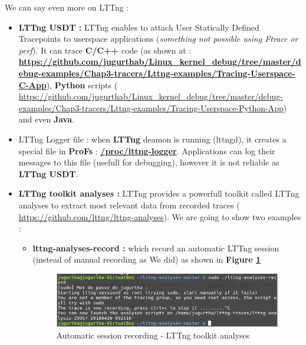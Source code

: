 We can say even more on LTTng : 
\begin{itemize}
	\item \textbf{LTTng USDT : } LTTng enables to attach User Statically Defined Tracepoints to userspace applications (\emph{something not possible using Ftrace or perf}). It can trace \textbf{C/C++} code (as shown at : \textbf{\color{blue}\url{https://github.com/jugurthab/Linux_kernel_debug/tree/master/debug-examples/Chap3-tracers/Lttng-examples/Tracing-Userspace-C-App}}), \textbf{Python} scripts ({\color{blue} \url{https://github.com/jugurthab/Linux_kernel_debug/tree/master/debug-examples/Chap3-tracers/Lttng-examples/Tracing-Userspace-Python-App}}) and even \textbf{Java}. 
	
	\item {LTTng Logger file : } when \textbf{LTTng} deamon is running (lttngd), it creates a special file in \textbf{ProFs} : \textbf{\color{red}\url{/proc/lttng-logger}}.
		Applications can log their messages to this file (usefull for debugging), however it is not reliable as \textbf{LTTng USDT}.
	
	\item \textbf{LTTng toolkit analyses : }
LTTng provides a powerfull toolkit called \og LTTng analyses \fg to extract most relevant data from recorded traces ({\color{blue} \url{https://github.com/lttng/lttng-analyses}}). We are going to show two examples :

		\begin{itemize}
			\item \textbf{lttng-analyses-record : } which record an automatic LTTng session (instead of manual recording as We did) as shown in \textbf{Figure \ref{Automatic session recording - LTTng toolkit analyses}}
					\begin{figure}[H]
						\centering
        				\includegraphics[scale=0.40]{img/solution/lttng-analyses-automatic-record.png}
        				\caption{Automatic session recording - LTTng toolkit analyses}
        				\label{Automatic session recording - LTTng toolkit analyses}
    				\end{figure}
			

\end{itemize}
\end{itemize}
